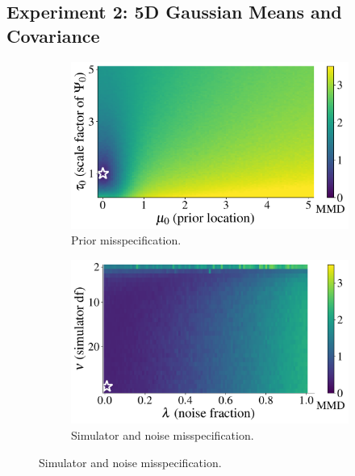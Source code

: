 \documentclass[twoside,11pt]{article}
\newcommand{\numberGaussianMeansCov}{2}
\newcommand{\0}{\boldsymbol{0}}
\begin{document}
\subsection{Experiment \numberGaussianMeansCov: 5D Gaussian Means and Covariance}
\begin{figure}[t]
    \begin{minipage}{.48\linewidth}
        \begin{subfigure}[t]{\linewidth}
            \includegraphics[width=\linewidth]{plots/abf_mvn_full_mmd_grid_prior.pdf}
            \caption{Prior misspecification.}
            \label{fig:app:mvn-full:MMD:prior}
        \end{subfigure}
    \end{minipage}
    \hfill
    \begin{minipage}{.48\linewidth}
        \begin{subfigure}[t]{\linewidth}
            \includegraphics[width=\linewidth]{plots/abf_mvn_full_mmd_grid_likelihood_noise.pdf}
            \caption{Simulator and noise misspecification.}

\end{subfigure}
\end{minipage}
\end{figure}
\end{document}
